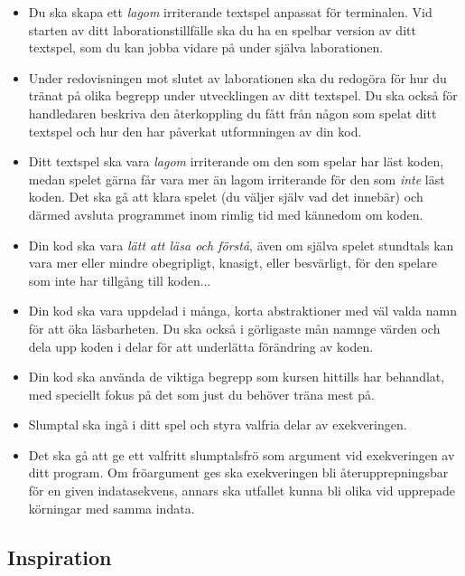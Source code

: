 \begin{itemize}
\item Du ska skapa ett \textit{lagom} irriterande textspel anpassat för terminalen. Vid starten av ditt laborationstillfälle ska du ha en spelbar version av ditt textspel, som du kan jobba vidare på under själva laborationen. 

\item Under redovisningen mot slutet av laborationen ska du redogöra för hur du tränat på olika begrepp under utvecklingen av ditt textspel. Du ska också för handledaren beskriva den återkoppling du fått från någon som spelat ditt textspel och hur den har påverkat utformningen av din kod. 

\item Ditt textspel ska vara \emph{lagom} irriterande om den som spelar har läst koden, medan spelet gärna får vara mer än lagom irriterande för den som \emph{inte} läst koden. Det ska gå att klara spelet (du väljer själv vad det innebär) och därmed avsluta programmet inom rimlig tid med kännedom om koden.

\item Din kod ska vara \textit{lätt att läsa och förstå}, även om själva spelet stundtals kan vara mer eller mindre obegripligt, knasigt, eller besvärligt, för den spelare som inte har tillgång till koden...

\item Din kod ska vara uppdelad i många, korta abstraktioner med väl valda namn för att öka läsbarheten. Du ska också i görligaste mån namnge värden och dela upp koden i delar för att underlätta förändring av koden.

\item Din kod ska använda de viktiga begrepp som kursen hittills har behandlat, med speciellt fokus på det som just du behöver träna mest på. 

\item Slumptal ska ingå i ditt spel och styra valfria delar av exekveringen.

\item Det ska gå att ge ett valfritt slumptalsfrö som argument vid exekveringen av ditt program. Om fröargument ges ska exekveringen bli återupprepningsbar för en given indatasekvens, annars ska utfallet kunna bli olika vid upprepade körningar med samma indata.
\end{itemize}

\subsection{Inspiration}

